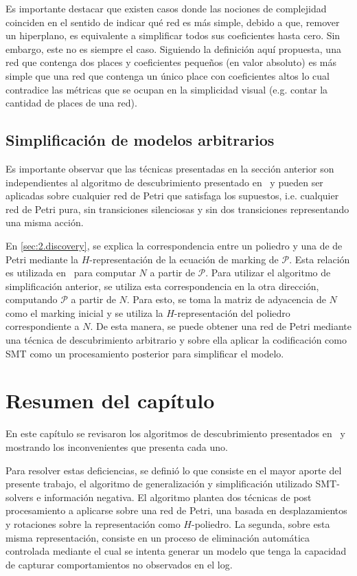 Es importante destacar que existen casos donde las nociones de complejidad coinciden en el sentido de indicar
qué red es más simple, debido a que, remover un hiperplano, es equivalente a simplificar todos sus coeficientes
hasta cero. Sin embargo, este no es siempre el caso. Siguiendo la definición aquí propuesta, una red que contenga
dos places y coeficientes pequeños (en valor absoluto) es más simple que una red que contenga un único place con 
coeficientes altos lo cual contradice las métricas que se ocupan en la simplicidad visual (e.g. contar la cantidad
de places de una red).

\subsection{Simplificación de modelos arbitrarios}
\label{sec:3.simplification}

Es importante observar que las técnicas presentadas en la sección anterior son independientes al algoritmo de 
descubrimiento presentado en~\cite{CarmonaC14} y pueden ser aplicadas sobre cualquier
red de Petri que satisfaga los supuestos, i.e. cualquier red de Petri pura, sin transiciones silenciosas y sin
dos transiciones representando una misma acción. 

En \autoref{sec:2.discovery}, se explica la correspondencia entre un poliedro y una de de Petri mediante
la $H$-representación de la ecuación de marking de $\mathcal{P}$. Esta relación es utilizada en~\cite{CarmonaC14}
para computar $N$ a partir de $\mathcal{P}$. Para utilizar el algoritmo de simplificación anterior, se utiliza
esta correspondencia en la otra dirección, computando $\mathcal{P}$ a partir de $N$. 
Para esto, se toma la matriz de adyacencia de $N$ como el marking inicial y se utiliza la 
$H$-representación del poliedro correspondiente a $N$. 
De esta manera, se puede obtener una red de Petri mediante una técnica de descubrimiento arbitrario
y sobre ella aplicar la codificación como SMT como un procesamiento posterior para simplificar el modelo.

\section{Resumen del capítulo}
\label{sec:3.resumen}

En este capítulo se revisaron los algoritmos de descubrimiento presentados en~\cite{CarmonaC14} y~\cite{LeonCB15}
mostrando los inconvenientes que presenta cada uno. 

Para resolver estas deficiencias, se definió lo que consiste en el mayor aporte del presente trabajo, el  algoritmo de
generalización y simplificación utilizado SMT-solvers e información negativa.
El algoritmo plantea dos técnicas de post procesamiento a aplicarse sobre una red de Petri, una basada en 
desplazamientos y rotaciones sobre la representación como $H$-poliedro. La segunda, sobre esta misma representación,
consiste en un proceso de eliminación automática controlada mediante el cual se intenta 
generar un modelo que tenga la capacidad de capturar comportamientos no observados en el log.

